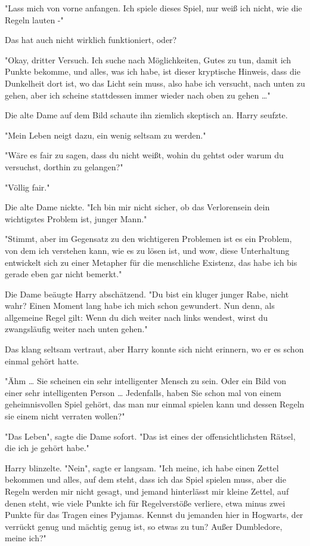{"Lass mich von vorne anfangen. Ich spiele dieses Spiel, nur weiß ich nicht, wie die Regeln lauten -"

Das hat auch nicht wirklich funktioniert, oder?

"Okay, dritter Versuch. Ich suche nach Möglichkeiten, Gutes zu tun, damit ich Punkte bekomme, und alles, was ich habe, ist dieser kryptische Hinweis, dass die Dunkelheit dort ist, wo das Licht sein muss, also habe ich versucht, nach unten zu gehen, aber ich scheine stattdessen immer wieder nach oben zu gehen …"

Die alte Dame auf dem Bild schaute ihn ziemlich skeptisch an. Harry seufzte.

"Mein Leben neigt dazu, ein wenig seltsam zu werden."

"Wäre es fair zu sagen, dass du nicht weißt, wohin du gehtst oder warum du versuchst, dorthin zu gelangen?"

"Völlig fair."

Die alte Dame nickte. "Ich bin mir nicht sicher, ob das Verlorensein dein wichtigstes Problem ist, junger Mann."

"Stimmt, aber im Gegensatz zu den wichtigeren Problemen ist es ein Problem, von dem ich verstehen kann, wie es zu lösen ist, und wow, diese Unterhaltung entwickelt sich zu einer Metapher für die menschliche Existenz, das habe ich bis gerade eben gar nicht bemerkt."

Die Dame beäugte Harry abschätzend. "Du bist ein kluger junger Rabe, nicht wahr? Einen Moment lang habe ich mich schon gewundert. Nun denn, als allgemeine Regel gilt: Wenn du dich weiter nach links wendest, wirst du zwangsläufig weiter nach unten gehen."

Das klang seltsam vertraut, aber Harry konnte sich nicht erinnern, wo er es schon einmal gehört hatte.

"Ähm … Sie scheinen ein sehr intelligenter Mensch zu sein. Oder ein Bild von einer sehr intelligenten Person … Jedenfalls, haben Sie schon mal von einem geheimnisvollen Spiel gehört, das man nur einmal spielen kann und dessen Regeln sie einem nicht verraten wollen?"

"Das Leben", sagte die Dame sofort. "Das ist eines der offensichtlichsten Rätsel, die ich je gehört habe."

Harry blinzelte. "Nein", sagte er langsam. "Ich meine, ich habe einen Zettel bekommen und alles, auf dem steht, dass ich das Spiel spielen muss, aber die Regeln werden mir nicht gesagt, und jemand hinterlässt mir kleine Zettel, auf denen steht, wie viele Punkte ich für Regelverstöße verliere, etwa minus zwei Punkte für das Tragen eines Pyjamas. Kennst du jemanden hier in Hogwarts, der verrückt genug und mächtig genug ist, so etwas zu tun? Außer Dumbledore, meine ich?"

}
